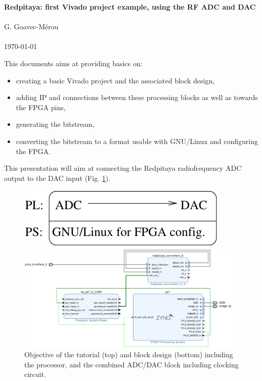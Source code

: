 \documentclass[10pt,oneside]{article}
\begin{document}
\begin{center}
{\bf \Large Redpitaya: first Vivado project example, using the RF ADC and DAC} \\ \ \\
G. Goavec-M\'erou \\ \ \\ \today
\end{center}

This documents aims at providing basics on:
\begin{itemize}
\setlength\itemsep{0em}
\item creating a basic Vivado project and the associated block design,
\item adding IP and connections between these processing blocks as well as towards the FPGA pins,
\item generating the bitstream,
\item converting the bitstream to a format usable with GNU/Linux and configuring the FPGA.
\end{itemize}

This presentation will aim at connecting the Redpitaya radiofrequency ADC 
output to the DAC input (Fig. \ref{bloc_design_final}).

\begin{figure}[h!tb]
\begin{center}
\includegraphics{objective}
\end{center}
\hspace{-1cm}\includegraphics[width=0.97\textwidth]{combinedADC_DAC.png}
\caption{Objective of the tutorial (top) and block design (bottom) including the processor, and
the combined ADC/DAC block including clocking circuit.}
\label{bloc_design_final}
\end{figure}
\end{document}
